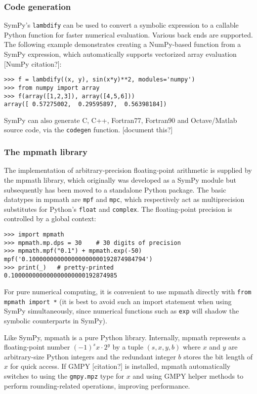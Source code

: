 \subsubsection{Code generation}

SymPy's \texttt{lambdify} can be used to convert a symbolic expression to a
callable Python function for faster numerical evaluation.
Various back ends are supported. The following example
demonstrates creating a NumPy-based function from
a SymPy expression, which automatically supports
vectorized array evaluation [NumPy citation?]:

\begin{verbatim}
>>> f = lambdify((x, y), sin(x*y)**2, modules='numpy')
>>> from numpy import array
>>> f(array([1,2,3]), array([4,5,6]))
array([ 0.57275002,  0.29595897,  0.56398184])
\end{verbatim}

SymPy can also generate C, C++, Fortran77, Fortran90 and
Octave/Matlab source code, via the \texttt{codegen} function. [document this?]

\subsubsection{The mpmath library}

The implementation of arbitrary-precision floating-point arithmetic
is supplied by the mpmath library, which originally was developed
as a SymPy module but subsequently has been
moved to a standalone Python package. The basic datatypes in mpmath
are \texttt{mpf} and \texttt{mpc}, which respectively act as
multiprecision substitutes for Python's \texttt{float} and \texttt{complex}.
The floating-point precision is controlled by a global context:

\begin{verbatim}
>>> import mpmath
>>> mpmath.mp.dps = 30    # 30 digits of precision
>>> mpmath.mpf("0.1") + mpmath.exp(-50)
mpf('0.100000000000000000000192874984794')
>>> print(_)   # pretty-printed
0.100000000000000000000192874985
\end{verbatim}

For pure numerical computing, it is convenient to use mpmath directly
with \texttt{from mpmath import *} (it is best to avoid such an
import statement when using SymPy simultaneously, since numerical
functions such as \texttt{exp} will shadow the symbolic counterparts
in SymPy).

Like SymPy, mpmath is a pure Python library.
Internally, mpmath represents a floating-point number
$(-1)^s x \cdot 2^y$ by a tuple $(s, x, y, b)$ where
$x$ and $y$ are arbitrary-size Python integers
and the redundant integer $b$ stores the bit length of $x$ for quick access.
If GMPY [citation?] is installed, mpmath automatically switches to
using the \texttt{gmpy.mpz} type for $x$ and using GMPY helper methods
to perform rounding-related operations, improving performance.

